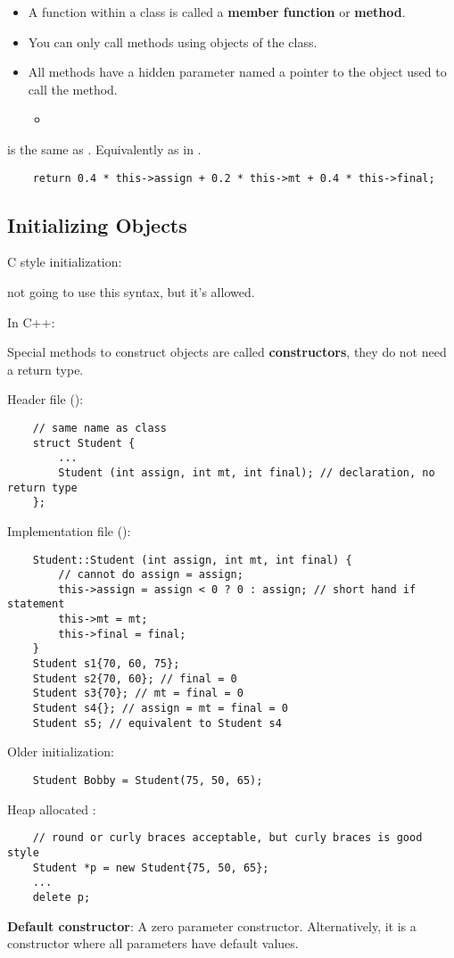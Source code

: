 \begin{itemize}
    \item A function within a class is called a \textbf{member function}
          or \textbf{method}.
    \item You can only call methods using objects of the class.
    \item All methods have a hidden parameter named 
          \textrightarrow{} a pointer to the object used to call the method.
          \begin{itemize}
              \item {}
          \end{itemize}
\end{itemize}
 is the same as . Equivalently as in
.
\begin{lstlisting}
    return 0.4 * this->assign + 0.2 * this->mt + 0.4 * this->final;
\end{lstlisting}

\subsection{Initializing Objects}
C style initialization:

 \textrightarrow{} not going to use this syntax,
but it's allowed.

In C++:

Special methods to construct objects are called \textbf{constructors}, they do
not need a return type.

Header file ():
\begin{lstlisting}
    // same name as class
    struct Student {
        ...
        Student (int assign, int mt, int final); // declaration, no return type
    };
\end{lstlisting}
Implementation file ():
\begin{lstlisting}
    Student::Student (int assign, int mt, int final) {
        // cannot do assign = assign;
        this->assign = assign < 0 ? 0 : assign; // short hand if statement
        this->mt = mt;
        this->final = final;
    }
    Student s1{70, 60, 75};
    Student s2{70, 60}; // final = 0
    Student s3{70}; // mt = final = 0
    Student s4{}; // assign = mt = final = 0
    Student s5; // equivalent to Student s4
\end{lstlisting}
Older initialization:
\begin{lstlisting}
    Student Bobby = Student(75, 50, 65);
\end{lstlisting}
Heap allocated :
\begin{lstlisting}
    // round or curly braces acceptable, but curly braces is good style
    Student *p = new Student{75, 50, 65};
    ...
    delete p;
\end{lstlisting}
\textbf{Default constructor}:
A zero parameter constructor. Alternatively, it is a constructor
where all parameters have default values.

